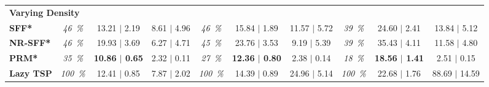 \begin{tabular}{lccccccccc}
\midrule
\multicolumn{13}{l}{ \bf Varying Density} \\ 
{ \bf SFF*} 
 & \textit{ 46~\% }  &  13.21 $|$ 2.19  &  8.61 $|$ 4.96  & \textit{ 46~\% }  &  15.84 $|$ 1.89  &  11.57 $|$ 5.72  & \textit{ 39~\% }  &  24.60 $|$ 2.41  &  13.84 $|$ 5.12 \\ 
{ \bf NR-SFF*} 
 & \textit{ 46~\% }  &  19.93 $|$ 3.69  &  6.27 $|$ 4.71  & \textit{ 45~\% }  &  23.76 $|$ 3.53  &  9.19 $|$ 5.39  & \textit{ 39~\% }  &  35.43 $|$ 4.11  &  11.58 $|$ 4.80 \\ 
{ \bf PRM*} 
 & \textit{ 35~\% }  & { \bf  10.86 $|$ 0.65 }  &  2.32 $|$ 0.11  & \textit{ 27~\% }  & { \bf  12.36 $|$ 0.80 }  &  2.38 $|$ 0.14  & \textit{ 18~\% }  & { \bf  18.56 $|$ 1.41 }  &  2.51 $|$ 0.15 \\ 
{ \bf Lazy TSP} 
 & \textit{ 100~\% }  &  12.41 $|$ 0.85  &  7.87 $|$ 2.02  & \textit{ 100~\% }  &  14.39 $|$ 0.89  &  24.96 $|$ 5.14  & \textit{ 100~\% }  &  22.68 $|$ 1.76  &  88.69 $|$ 14.59 \\ 
\bottomrule
\end{tabular}
